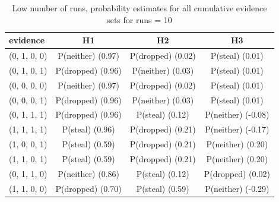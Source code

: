 \documentclass[11pt]{article}
\begin{document}
\begin{table}
\begin{center}
\begin{tabular}{|l|c|c|c|}
\hline
evidence & H1 & H2 & H3 \\
\hline
(0, 1, 0, 0)&P(neither) (0.97) & P(dropped) (0.02) & P(steal) (0.01) \\
(0, 1, 0, 1)&P(dropped) (0.96) & P(neither) (0.03) & P(steal) (0.01) \\
(0, 0, 0, 0)&P(neither) (0.97) & P(dropped) (0.02) & P(steal) (0.01) \\
(0, 0, 0, 1)&P(dropped) (0.96) & P(neither) (0.03) & P(steal) (0.01) \\
(0, 1, 1, 1)&P(dropped) (0.96) & P(steal) (0.12) & P(neither) (-0.08) \\
(1, 1, 1, 1)&P(steal) (0.96) & P(dropped) (0.21) & P(neither) (-0.17) \\
(1, 0, 0, 1)&P(steal) (0.59) & P(dropped) (0.21) & P(neither) (0.20) \\
(1, 1, 0, 1)&P(steal) (0.59) & P(dropped) (0.21) & P(neither) (0.20) \\
(0, 1, 1, 0)&P(neither) (0.86) & P(steal) (0.12) & P(dropped) (0.02) \\
(1, 1, 0, 0)&P(dropped) (0.70) & P(steal) (0.59) & P(neither) (-0.29) \\
\hline
\end{tabular}
\end{center}
\caption{ Low number of runs, probability estimates for all cumulative evidence sets for runs =  10}
\label{journal}
\end{table}
\end{document}
